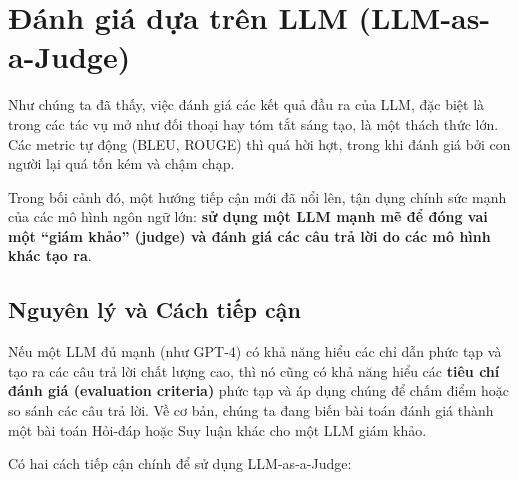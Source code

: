 
\section{Đánh giá dựa trên LLM (LLM-as-a-Judge)}
\label{sec:llm_as_a_judge}

Như chúng ta đã thấy, việc đánh giá các kết quả đầu ra của LLM, đặc biệt là trong các tác vụ mở như đối thoại hay tóm tắt sáng tạo, là một thách thức lớn. Các metric tự động (BLEU, ROUGE) thì quá hời hợt, trong khi đánh giá bởi con người lại quá tốn kém và chậm chạp.

Trong bối cảnh đó, một hướng tiếp cận mới đã nổi lên, tận dụng chính sức mạnh của các mô hình ngôn ngữ lớn: \textbf{sử dụng một LLM mạnh mẽ để đóng vai một “giám khảo” (judge) và đánh giá các câu trả lời do các mô hình khác tạo ra}.

\subsection{Nguyên lý và Cách tiếp cận}
\label{ssec:llm_judge_principles}

\begin{tcolorbox}[
    title=Trực giác cốt lõi,
    colback=green!5!white, colframe=green!60!black, fonttitle=\bfseries
]
Nếu một LLM đủ mạnh (như GPT-4) có khả năng hiểu các chỉ dẫn phức tạp và tạo ra các câu trả lời chất lượng cao, thì nó cũng có khả năng hiểu các \textbf{tiêu chí đánh giá (evaluation criteria)} phức tạp và áp dụng chúng để chấm điểm hoặc so sánh các câu trả lời. Về cơ bản, chúng ta đang biến bài toán đánh giá thành một bài toán Hỏi-đáp hoặc Suy luận khác cho một LLM giám khảo.
\end{tcolorbox}

Có hai cách tiếp cận chính để sử dụng LLM-as-a-Judge:

